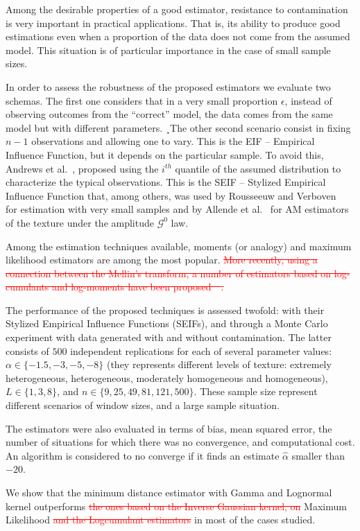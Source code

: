\documentclass[a4paper]{article} %
\begin{document}
Among the desirable properties of a good estimator, resistance to contamination is very important in practical applications. 
That is, its ability to produce good estimations even when a proportion of the data does not come from the assumed model. 
This situation is of particular importance in the case of small sample sizes.

In order to assess the robustness of the proposed estimators we evaluate two schemas. 
The first one considers that in a very small proportion $\epsilon$, instead of observing outcomes from the ``correct'' model, the data comes from the same model but with different parameters.
¸The other second scenario consist in fixing $n-1$ observations and allowing one to vary. 
This is the EIF -- Empirical Influence Function, but it depends on the particular sample.
To avoid this, Andrews et al.~\cite{Andrews1972}, proposed using the $i^{th}$ quantile of the assumed distribution to characterize the typical observations.
This is the SEIF -- Stylized Empirical Influence Function that, among others, was used by Rousseeuw and Verboven~\cite{RousseeuwCSDA} for estimation with very small samples and by Allende et al.~\cite{AllendeFreryetal:JSCS:05} for AM estimators of the texture under the amplitude $\mathcal G^0$ law.

Among the estimation techniques available, moments (or analogy) and maximum likelihood estimators are among the most popular.  
\textcolor{red}{\sout{More recently, using a connection between the Mellin's transform, a number of estimators based on log-cumulants  and log-moments have been proposed~~\mbox{\cite{MellinAnalysisPolSAR,BujorTrouveValetNicolas2004,khan2014}.}}}

The performance of the proposed techniques is assessed twofold: with their Stylized Empirical Influence Functions (SEIFs), and through a Monte Carlo experiment with data generated with and without contamination. 
The latter consists of $500$ independent replications for each of several parameter values: 
$\alpha\in\{-1.5, -3, -5, -8\}$ (they represents different levels of texture: extremely heterogeneous, heterogeneous, moderately homogeneous and homogeneous), 
$L\in\{1,3,8\}$, and 
$n\in\{9, 25,49, 81,121,500\}$. 
These sample size represent different scenarios of window sizes, and a large sample situation.

The estimators were also evaluated in terms of bias, mean squared error, the number of situations for which there was no convergence, and computational cost. 
An algorithm is considered to no converge if it finds an estimate $\widehat{\alpha}$ smaller than $-20$.

We show that the minimum distance estimator with Gamma and Lognormal kernel outperforms \textcolor{red}{\sout{the ones based on the Inverse Gaussian kernel, on}} Maximum Likelihood \textcolor{red}{\sout{and the Logcumulant estimators}} in most of the cases studied.



\end{document}
